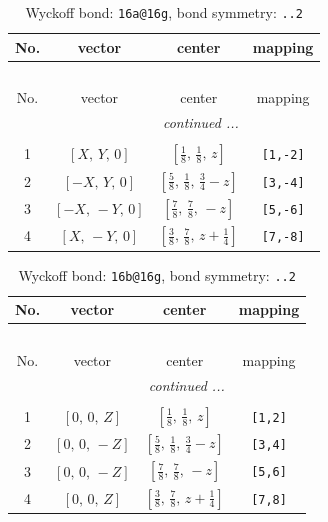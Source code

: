 \documentclass[fleqn,8pt]{jsarticle}
\begin{document}
\begin{longtable}{cccc}
\caption{Wyckoff bond: {\tt 16a@16g}, bond symmetry: {\tt ..2}}
 \\
 \hline \hline
No. & vector & center & mapping \\ \hline \endfirsthead

\multicolumn{3}{l}{\tablename\ \thetable{}} \\
 \hline \hline
No. & vector & center & mapping \\ \hline \endhead

 \hline \hline
\multicolumn{3}{r}{\footnotesize\it continued ...} \\ \endfoot

 \hline \hline
\multicolumn{3}{r}{} \\ \endlastfoot

1 & $\left[ X,\, Y,\, 0 \right]$ & $\left[ \frac{1}{8},\, \frac{1}{8},\, z \right]$ & {\tt [1,-2]} \\ \hline
2 & $\left[ - X,\, Y,\, 0 \right]$ & $\left[ \frac{5}{8},\, \frac{1}{8},\, \frac{3}{4} - z \right]$ & {\tt [3,-4]} \\ \hline
3 & $\left[ - X,\, - Y,\, 0 \right]$ & $\left[ \frac{7}{8},\, \frac{7}{8},\, - z \right]$ & {\tt [5,-6]} \\ \hline
4 & $\left[ X,\, - Y,\, 0 \right]$ & $\left[ \frac{3}{8},\, \frac{7}{8},\, z + \frac{1}{4} \right]$ & {\tt [7,-8]} \\
\end{longtable}
\renewcommand{\arraystretch}{1.2}
\begin{longtable}{cccc}
\caption{Wyckoff bond: {\tt 16b@16g}, bond symmetry: {\tt ..2}}
 \\
 \hline \hline
No. & vector & center & mapping \\ \hline \endfirsthead

\multicolumn{3}{l}{\tablename\ \thetable{}} \\
 \hline \hline
No. & vector & center & mapping \\ \hline \endhead

 \hline \hline
\multicolumn{3}{r}{\footnotesize\it continued ...} \\ \endfoot

 \hline \hline
\multicolumn{3}{r}{} \\ \endlastfoot

1 & $\left[ 0,\, 0,\, Z \right]$ & $\left[ \frac{1}{8},\, \frac{1}{8},\, z \right]$ & {\tt [1,2]} \\ \hline
2 & $\left[ 0,\, 0,\, - Z \right]$ & $\left[ \frac{5}{8},\, \frac{1}{8},\, \frac{3}{4} - z \right]$ & {\tt [3,4]} \\ \hline
3 & $\left[ 0,\, 0,\, - Z \right]$ & $\left[ \frac{7}{8},\, \frac{7}{8},\, - z \right]$ & {\tt [5,6]} \\ \hline
4 & $\left[ 0,\, 0,\, Z \right]$ & $\left[ \frac{3}{8},\, \frac{7}{8},\, z + \frac{1}{4} \right]$ & {\tt [7,8]} \\
\end{longtable}
\end{document}
